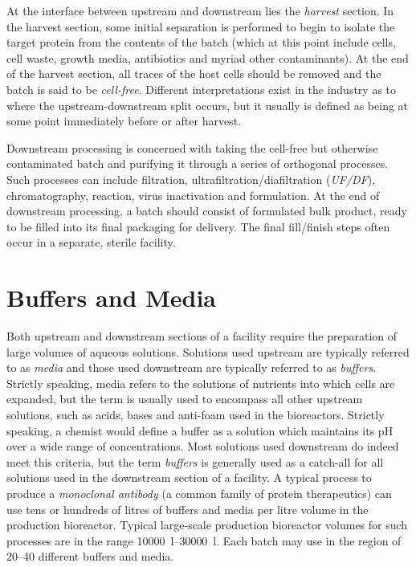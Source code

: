 At the interface between upstream and downstream lies the \emph{harvest}
section.
In the harvest section, some initial separation is performed to begin
to isolate the target protein from the contents of the batch (which at this
point include cells, cell waste, growth media, antibiotics and myriad other
contaminants).
At the end of the harvest section, all traces of the host cells
should be removed and the batch is said to be \emph{cell-free}.
Different interpretations exist in the industry as to where the
upstream-downstream split occurs, but it usually is defined as being at some
point immediately before or after harvest.

Downstream processing is concerned with taking the cell-free but otherwise 
contaminated batch and purifying it through a series of orthogonal processes.
Such processes can include filtration, ultrafiltration/diafiltration 
(\emph{UF/DF}), chromatography, reaction, virus inactivation and formulation.
At the end of downstream processing, a batch should consist of formulated bulk
product, ready to be filled into its final packaging for delivery.
The final fill/finish steps often occur in a separate, sterile facility.

\section{Buffers and Media}\label{SS.buffmed}

Both upstream and downstream sections of a facility require the preparation of
large volumes of aqueous solutions.
Solutions used upstream are typically referred to as \emph{media} and those
used downstream are typically referred to as \emph{buffers}.
Strictly speaking, media refers to the solutions of nutrients into which cells
are expanded, but the term is usually used to encompass all other upstream
solutions, such as acids, bases and anti-foam used in the bioreactors.
Strictly speaking, a chemist would define a buffer as a solution which
maintains its pH over a wide range of concentrations.
Most solutions used downstream do indeed meet this criteria, but the term 
\emph{buffers} is generally used as a catch-all for all solutions used in the
downstream section of a facility.
A typical process to produce a \emph{monoclonal antibody} (a common family of 
protein therapeutics) can use tens or hundreds of litres of buffers and media 
per litre volume in the production bioreactor.
Typical large-scale production bioreactor volumes for such processes are in the
range \SIrange{10000}{30000}{\litre}.
Each batch may use in the region of \numrange[range-phrase=--]{20}{40} different
buffers and media.

